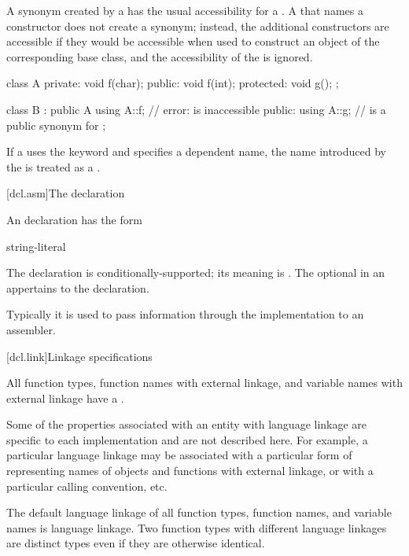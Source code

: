 \pnum
A synonym created by a  has the usual
accessibility for a .
A  that names a constructor does not
create a synonym; instead, the additional constructors
are accessible if they would be accessible
when used to construct an object of the corresponding base class,
and the accessibility of the  is ignored.
\begin{example}

\begin{codeblock}
class A {
private:
    void f(char);
public:
    void f(int);
protected:
    void g();
};

class B : public A {
  using A::f;       // error:  is inaccessible
public:
  using A::g;       //  is a public synonym for 
};
\end{codeblock}
\end{example}

\pnum
If a  uses the keyword  and
specifies a dependent name, the name introduced by the
 is treated as a
.%

[dcl.asm]{The  declaration}%
%
%

\pnum
An  declaration has the form

\begin{bnf}
\br
      \terminal{(} string-literal \terminal{) ;}
\end{bnf}

The  declaration is conditionally-supported; its meaning is
.
The optional  in
an  appertains to the  declaration.
\begin{note}
Typically it is used to pass information through the implementation to
an assembler.
\end{note}

[dcl.link]{Linkage specifications}%

\pnum
All function types, function names with external linkage, and variable
names with external linkage have a .
\begin{note}
Some of the properties associated with an entity with language linkage
are specific to each implementation and are not described here. For
example, a particular language linkage may be associated with a
particular form of representing names of objects and functions with
external linkage, or with a particular calling convention, etc.
\end{note}
The default language linkage of all function types, function names, and
variable names is \Cpp{} language linkage. Two function types with
different language linkages are distinct types even if they are
otherwise identical.

